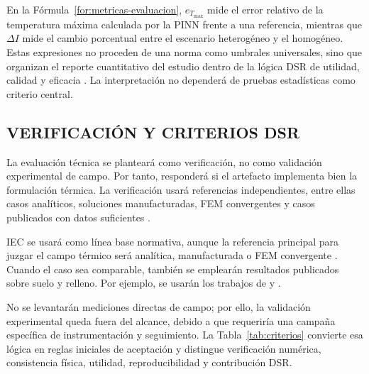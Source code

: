 \documentclass[11pt,a4paper,oneside]{report}
\begin{document}
En la Fórmula~\ref{for:metricas-evaluacion}, $e_{T_{\max}}$ mide el error relativo de la temperatura máxima calculada por la PINN frente a una referencia, mientras que $\Delta I$ mide el cambio porcentual entre el escenario heterogéneo y el homogéneo. Estas expresiones no proceden de una norma como umbrales universales, sino que organizan el reporte cuantitativo del estudio dentro de la lógica DSR de utilidad, calidad y eficacia \parencite[350--351]{gregor2013}. La interpretación no dependerá de pruebas estadísticas como criterio central.

\subsection{VERIFICACIÓN Y CRITERIOS DSR}
\label{subsec:verificacion-dsr}

La evaluación técnica se planteará como verificación, no como validación experimental de campo. Por tanto, responderá si el artefacto implementa bien la formulación térmica. La verificación usará referencias independientes, entre ellas casos analíticos, soluciones manufacturadas, FEM convergentes y casos publicados con datos suficientes \parencite[3--4,93--99]{cigre2025}.

IEC se usará como línea base normativa, aunque la referencia principal para juzgar el campo térmico será analítica, manufacturada o FEM convergente \parencite[3--4,93--99]{cigre2025}. Cuando el caso sea comparable, también se emplearán resultados publicados sobre suelo y relleno. Por ejemplo, se usarán los trabajos de \textcite[1,6--7]{khumalo2025} y \textcite[9--10,16]{kim2025}.

No se levantarán mediciones directas de campo; por ello, la validación experimental queda fuera del alcance, debido a que requeriría una campaña específica de instrumentación y seguimiento. La Tabla~\ref{tab:criterios} convierte esa lógica en reglas iniciales de aceptación y distingue verificación numérica, consistencia física, utilidad, reproducibilidad y contribución DSR.
\end{document}
